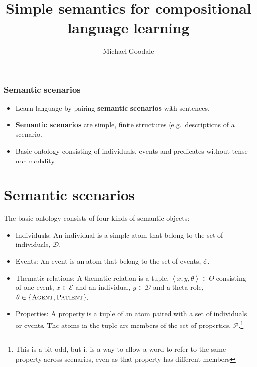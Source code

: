\documentclass[aspectratio=169]{beamer}
\author{Michael Goodale}
\title{Simple semantics for compositional language learning}
\begin{document}
\begin{frame}
	\titlepage
\end{frame}


\begin{frame}
  \frametitle{Semantic scenarios}
  \begin{itemize}
    \item Learn language by pairing \textbf{semantic scenarios} with sentences. 
    \item \textbf{Semantic scenarios} are simple, finite structures (e.g.\ descriptions of a scenario.
    \item Basic ontology consisting of individuals, events and predicates without tense nor modality.
  \end{itemize}
\end{frame}

\section{Semantic scenarios}
\begin{frame}
The basic ontology consists of four kinds of semantic objects:
\begin{itemize}
  \item Individuals: An individual is a simple atom that belong to the set of individuals, $\mathcal{D}$.
  \item Events: An event is an atom that belong to the set of events, $\mathcal{E}$. 
  \item Thematic relations: A thematic relation is a tuple, $\left\langle x, y, \theta\right\rangle\in \Theta$ consisting of one event, $x\in\mathcal{E}$ and an individual, $y\in\mathcal{D}$ and a theta role, $\theta\in\{\textsc{Agent}, \textsc{Patient}\}$.
  \item Properties: A property is a tuple of an atom paired with a set of individuals or events. The atoms in the tuple are members of the set of properties, $\mathcal{P}$.\footnote{This is a bit odd, but it is a way to allow a word to refer to the same property across scenarios, even as that property has different members}
\end{itemize}
\end{frame}
\end{document}
